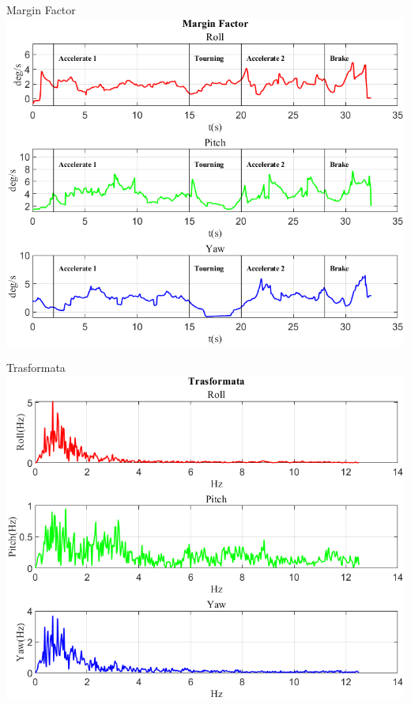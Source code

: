 \documentclass[beamer]{standalone}
\begin{document}
	\begin{frame}{{Margin Factor}}
		\centering\includegraphics[height=.8\textheight]{figure/VAng/Margin Factor}
	\end{frame}
	
	\begin{frame}{{Trasformata}}
		\centering\includegraphics[height=.8\textheight]{figure/VAng/Trasformata/Trasformata}
	\end{frame}
	
\end{document}
